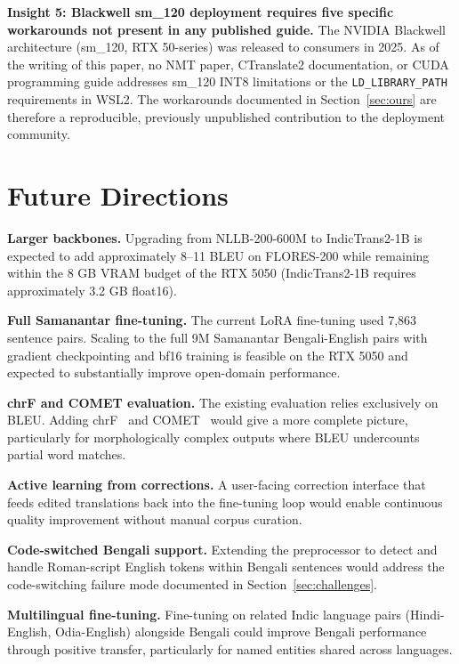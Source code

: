 \documentclass[conference]{IEEEtran}
\begin{document}
\textbf{Insight 5: Blackwell sm\_120 deployment requires five specific
workarounds not present in any published guide.}
The NVIDIA Blackwell architecture (sm\_120, RTX 50-series) was released
to consumers in 2025.
As of the writing of this paper, no NMT paper, CTranslate2 documentation,
or CUDA programming guide addresses sm\_120 INT8 limitations or the
\texttt{LD\_LIBRARY\_PATH} requirements in WSL2.
The workarounds documented in Section~\ref{sec:ours} are therefore a
reproducible, previously unpublished contribution to the deployment community.

\section{Future Directions}
\label{sec:future}

\textbf{Larger backbones.}
Upgrading from NLLB-200-600M to IndicTrans2-1B is expected to add
approximately 8--11 BLEU on FLORES-200 while remaining within the 8 GB
VRAM budget of the RTX 5050 (IndicTrans2-1B requires approximately
3.2 GB float16).

\textbf{Full Samanantar fine-tuning.}
The current LoRA fine-tuning used 7,863 sentence pairs.
Scaling to the full 9M Samanantar Bengali-English pairs with
gradient checkpointing and bf16 training is feasible on the RTX 5050
and expected to substantially improve open-domain performance.

\textbf{chrF and COMET evaluation.}
The existing evaluation relies exclusively on BLEU.
Adding chrF~\cite{popovic2015chrf} and COMET~\cite{rei2020comet} would
give a more complete picture, particularly for morphologically complex
outputs where BLEU undercounts partial word matches.

\textbf{Active learning from corrections.}
A user-facing correction interface that feeds edited translations back
into the fine-tuning loop would enable continuous quality improvement
without manual corpus curation.

\textbf{Code-switched Bengali support.}
Extending the preprocessor to detect and handle Roman-script English
tokens within Bengali sentences would address the code-switching failure
mode documented in Section~\ref{sec:challenges}.

\textbf{Multilingual fine-tuning.}
Fine-tuning on related Indic language pairs (Hindi-English,
Odia-English) alongside Bengali could improve Bengali performance
through positive transfer, particularly for named entities shared
across languages.
\end{document}
